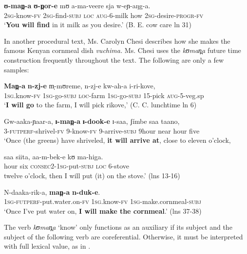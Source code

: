 \documentclass[output=paper]{langsci/langscibook}
\begin{document}
\ea\label{ex:sarvasy:21}
\gll \textbf{ʊ-man̪-a}   \textbf{ʊ-n̪or-e}     mʊ   a-ma-veere   sja   w-eɲ-aŋg-a. \\
\textsc{2sg-}know-\textsc{fv}  \textsc{2sg}-find-\textsc{subj}  \textsc{loc}  \textsc{aug-}6-milk  how  \textsc{2sg}-desire-\textsc{progr}-\textsc{fv} \\
\glt ‘\textbf{You will find} in it milk as you desire.’ (B. E. cow care ln 31)
\z

In another procedural text, Ms. Carolyn Chesi describes how she makes the famous Kenyan cornmeal dish \textit{vuchima.} Ms. Chesi uses the \textit{kʊman̪a} future time construction frequently throughout the text. The following are only a few samples:

\ea\label{ex:sarvasy:22}
\gll \textbf{Man̪-a}     \textbf{n-zj-e}     m̩-mʊreme,   n-zj-e     kw-ah-a     i-ri-kove, \\
\textsc{1sg}.know-\textsc{fv}  \textsc{1sg}-go-\textsc{subj}  \textsc{loc}-farm  \textsc{1sg}-go-\textsc{subj}  15-pick    \textsc{aug}-5-veg.sp \\
\glt ‘\textbf{I will go} to the farm, I will pick rikove,’ (C. C. lunchtime ln 6)
\z

\ea\label{ex:sarvasy:23}
\gll Gw-aaka-ɲaar-a,   \textbf{ɪ-man̪-a}   \textbf{ɪ-dook-e}   ɪ-saa,   ʃ\'{i}mbe   saa   taano, \\
3-\textsc{futperf-}shrivel-\textsc{fv}  9-know-\textsc{fv}  9-arrive-\textsc{subj}    9hour    near  hour  five \\
\glt ‘Once (the greens) have shriveled, \textbf{it will arrive at}, close to eleven o’clock,

\gll saa   siita,   aa-m-bek-e       kʊ   ma-higa. \\
hour  six  \textsc{consec2-1sg}-put-\textsc{subj}  \textsc{loc}  6-stove \\
\glt twelve o'clock, then I will put (it) on the stove.’ (lns 13-16)
\z 

\ea\label{ex:sarvasy:24}
\gll N-daaka-rik-a,         \textbf{man̪-a}     \textbf{n-duk-e}. \\
\textsc{1sg-futperf}-put.water.on-\textsc{fv}  1\textsc{sg.}know-\textsc{fv}    \textsc{1sg}-make.cornmeal-\textsc{subj} \\
\glt ‘Once I've put water on, \textbf{I will make the cornmeal}.’ (lns 37-38)
\z

The verb \textit{kʊman̪a} ‘know’ only functions as an auxiliary if its subject and the subject of the following verb are coreferential. Otherwise, it must be interpreted with full lexical value, as in .
\end{document}
